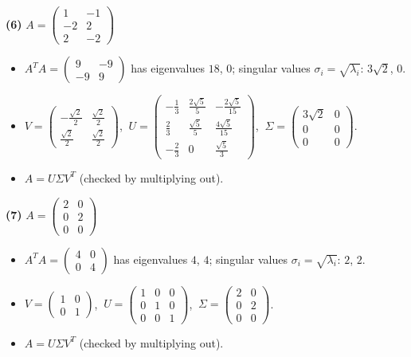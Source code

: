 \noindent\textbf{(6)} $A=\begin{pmatrix}1 & -1 \\ -2 & 2 \\ 2 & -2\end{pmatrix}$
\begin{itemize}\item $A^TA=\begin{pmatrix}9 & -9 \\ -9 & 9\end{pmatrix}$ has eigenvalues $18$, $0$; singular values $\sigma_i=\sqrt{\lambda_i}$: $3 \sqrt{2}$, $0$.
\item $V=\begin{pmatrix}- \frac{\sqrt{2}}{2} & \frac{\sqrt{2}}{2} \\ \frac{\sqrt{2}}{2} & \frac{\sqrt{2}}{2}\end{pmatrix}$, $\ U=\begin{pmatrix}- \frac{1}{3} & \frac{2 \sqrt{5}}{5} & - \frac{2 \sqrt{5}}{15} \\ \frac{2}{3} & \frac{\sqrt{5}}{5} & \frac{4 \sqrt{5}}{15} \\ - \frac{2}{3} & 0 & \frac{\sqrt{5}}{3}\end{pmatrix}$, $\ \Sigma=\begin{pmatrix}3 \sqrt{2} & 0 \\ 0 & 0 \\ 0 & 0\end{pmatrix}$.
\item $A=U\Sigma V^T$ (checked by multiplying out).\end{itemize}

\noindent\textbf{(7)} $A=\begin{pmatrix}2 & 0 \\ 0 & 2 \\ 0 & 0\end{pmatrix}$
\begin{itemize}\item $A^TA=\begin{pmatrix}4 & 0 \\ 0 & 4\end{pmatrix}$ has eigenvalues $4$, $4$; singular values $\sigma_i=\sqrt{\lambda_i}$: $2$, $2$.
\item $V=\begin{pmatrix}1 & 0 \\ 0 & 1\end{pmatrix}$, $\ U=\begin{pmatrix}1 & 0 & 0 \\ 0 & 1 & 0 \\ 0 & 0 & 1\end{pmatrix}$, $\ \Sigma=\begin{pmatrix}2 & 0 \\ 0 & 2 \\ 0 & 0\end{pmatrix}$.
\item $A=U\Sigma V^T$ (checked by multiplying out).\end{itemize}

